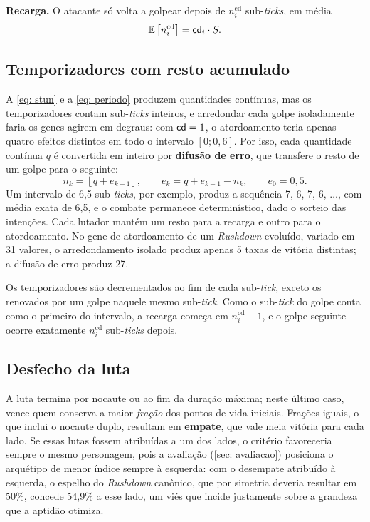\textbf{Recarga.} O atacante só volta a golpear depois de $n^{\mathrm{cd}}_i$ sub-\textit{ticks}, em média
\begin{equation}
    \label{eq: periodo}
    \mathbb{E}\left[n^{\mathrm{cd}}_i\right] = \mathsf{cd}_i \cdot S.
\end{equation}

\subsection{Temporizadores com resto acumulado}
\label{sub: resto}

A \autoref{eq: stun} e a \autoref{eq: periodo} produzem quantidades contínuas, mas os temporizadores contam sub-\textit{ticks} inteiros, e arredondar cada golpe isoladamente faria os genes agirem em degraus: com $\mathsf{cd} = 1$, o atordoamento teria apenas quatro efeitos distintos em todo o intervalo $[0; 0{,}6]$. Por isso, cada quantidade contínua $q$ é convertida em inteiro por \textbf{difusão de erro}, que transfere o resto de um golpe para o seguinte:
\begin{equation}
    \label{eq: resto}
    n_k = \left\lfloor q + e_{k-1} \right\rfloor,
    \qquad
    e_k = q + e_{k-1} - n_k,
    \qquad
    e_0 = 0{,}5.
\end{equation}
Um intervalo de 6,5 sub-\textit{ticks}, por exemplo, produz a sequência 7, 6, 7, 6, $\ldots$, com média exata de 6,5, e o combate permanece determinístico, dado o sorteio das intenções. Cada lutador mantém um resto para a recarga e outro para o atordoamento. No gene de atordoamento de um \textit{Rushdown} evoluído, variado em 31 valores, o arredondamento isolado produz apenas 5 taxas de vitória distintas; a difusão de erro produz 27.

Os temporizadores são decrementados ao fim de cada sub-\textit{tick}, exceto os renovados por um golpe naquele mesmo sub-\textit{tick}. Como o sub-\textit{tick} do golpe conta como o primeiro do intervalo, a recarga começa em $n^{\mathrm{cd}}_i - 1$, e o golpe seguinte ocorre exatamente $n^{\mathrm{cd}}_i$ sub-\textit{ticks} depois.

\subsection{Desfecho da luta}
\label{sub: desfecho}

A luta termina por nocaute ou ao fim da duração máxima; neste último caso, vence quem conserva a maior \textit{fração} dos pontos de vida iniciais. Frações iguais, o que inclui o nocaute duplo, resultam em \textbf{empate}, que vale meia vitória para cada lado. Se essas lutas fossem atribuídas a um dos lados, o critério favoreceria sempre o mesmo personagem, pois a avaliação (\autoref{sec: avaliacao}) posiciona o arquétipo de menor índice sempre à esquerda: com o desempate atribuído à esquerda, o espelho do \textit{Rushdown} canônico, que por simetria deveria resultar em 50\%, concede 54,9\% a esse lado, um viés que incide justamente sobre a grandeza que a aptidão otimiza.

